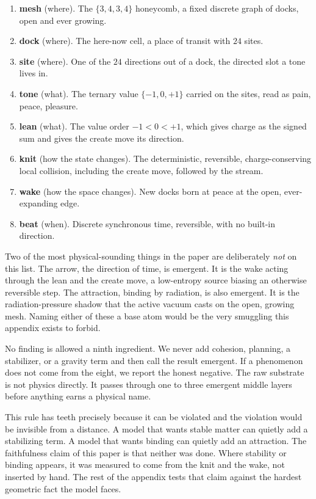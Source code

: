 \begin{enumerate}
\item \textbf{mesh} (where). The $\{3,4,3,4\}$ honeycomb, a fixed discrete graph of docks, open and ever growing.
\item \textbf{dock} (where). The here-now cell, a place of transit with $24$ sites.
\item \textbf{site} (where). One of the $24$ directions out of a dock, the directed slot a tone lives in.
\item \textbf{tone} (what). The ternary value $\{-1, 0, +1\}$ carried on the sites, read as pain, peace, pleasure.
\item \textbf{lean} (what). The value order $-1 < 0 < +1$, which gives charge as the signed sum and gives the create move its direction.
\item \textbf{knit} (how the state changes). The deterministic, reversible, charge-conserving local collision, including the create move, followed by the stream.
\item \textbf{wake} (how the space changes). New docks born at peace at the open, ever-expanding edge.
\item \textbf{beat} (when). Discrete synchronous time, reversible, with no built-in direction.
\end{enumerate}

Two of the most physical-sounding things in the paper are deliberately \emph{not} on this list. The arrow, the direction of time, is emergent. It is the wake acting through the lean and the create move, a low-entropy source biasing an otherwise reversible step. The attraction, binding by radiation, is also emergent. It is the radiation-pressure shadow that the active vacuum casts on the open, growing mesh. Naming either of these a base atom would be the very smuggling this appendix exists to forbid.

\begin{principle}
No finding is allowed a ninth ingredient. We never add cohesion, planning, a stabilizer, or a gravity term and then call the result emergent. If a phenomenon does not come from the eight, we report the honest negative. The raw substrate is not physics directly. It passes through one to three emergent middle layers before anything earns a physical name.
\end{principle}

This rule has teeth precisely because it can be violated and the violation would be invisible from a distance. A model that wants stable matter can quietly add a stabilizing term. A model that wants binding can quietly add an attraction. The faithfulness claim of this paper is that neither was done. Where stability or binding appears, it was measured to come from the knit and the wake, not inserted by hand. The rest of the appendix tests that claim against the hardest geometric fact the model faces.

